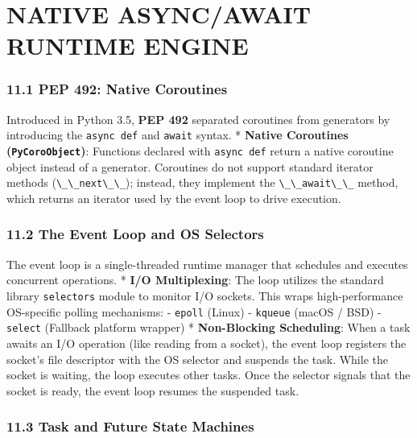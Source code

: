 \hypertarget{native-asyncawait-runtime-engine}{%
\chapter{NATIVE ASYNC/AWAIT RUNTIME
ENGINE}\label{native-asyncawait-runtime-engine}}

\hypertarget{pep-492-native-coroutines}{%
\subsection{11.1 PEP 492: Native
Coroutines}\label{pep-492-native-coroutines}}

Introduced in Python 3.5, \textbf{PEP 492} separated coroutines from
generators by introducing the \passthrough{\lstinline!async def!} and
\passthrough{\lstinline!await!} syntax. * \textbf{Native Coroutines
(\passthrough{\lstinline!PyCoroObject!})}: Functions declared with
\passthrough{\lstinline!async def!} return a native coroutine object
instead of a generator. Coroutines do not support standard iterator
methods (\passthrough{\lstinline!\_\_next\_\_!}); instead, they
implement the \passthrough{\lstinline!\_\_await\_\_!} method, which
returns an iterator used by the event loop to drive execution.

\hypertarget{the-event-loop-and-os-selectors}{%
\subsection{11.2 The Event Loop and OS
Selectors}\label{the-event-loop-and-os-selectors}}

The event loop is a single-threaded runtime manager that schedules and
executes concurrent operations. * \textbf{I/O Multiplexing}: The loop
utilizes the standard library \passthrough{\lstinline!selectors!} module
to monitor I/O sockets. This wraps high-performance OS-specific polling
mechanisms: - \passthrough{\lstinline!epoll!} (Linux) -
\passthrough{\lstinline!kqueue!} (macOS / BSD) -
\passthrough{\lstinline!select!} (Fallback platform wrapper) *
\textbf{Non-Blocking Scheduling}: When a task awaits an I/O operation
(like reading from a socket), the event loop registers the socket's file
descriptor with the OS selector and suspends the task. While the socket
is waiting, the loop executes other tasks. Once the selector signals
that the socket is ready, the event loop resumes the suspended task.

\hypertarget{task-and-future-state-machines}{%
\subsection{11.3 Task and Future State
Machines}\label{task-and-future-state-machines}}

